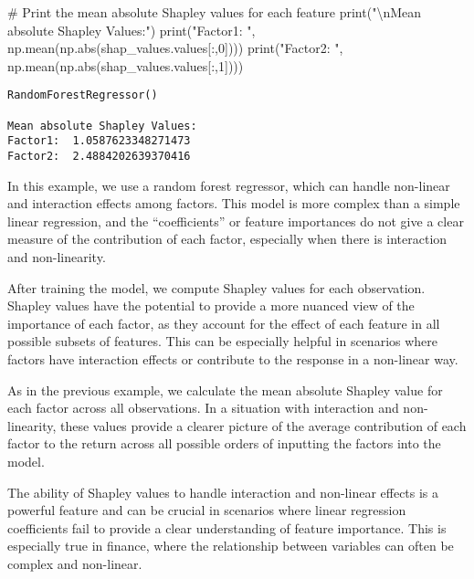 \documentclass[
  letterpaper,
  DIV=11,
  numbers=noendperiod]{scrartcl}
\newenvironment{Shaded}{\begin{snugshade}}{\end{snugshade}}
\newcommand{\BuiltInTok}[1]{\textcolor[rgb]{0.00,0.23,0.31}{#1}}
\newcommand{\CharTok}[1]{\textcolor[rgb]{0.13,0.47,0.30}{#1}}
\newcommand{\CommentTok}[1]{\textcolor[rgb]{0.37,0.37,0.37}{#1}}
\newcommand{\DecValTok}[1]{\textcolor[rgb]{0.68,0.00,0.00}{#1}}
\newcommand{\InformationTok}[1]{\textcolor[rgb]{0.37,0.37,0.37}{#1}}
\newcommand{\NormalTok}[1]{\textcolor[rgb]{0.00,0.23,0.31}{#1}}
\newcommand{\StringTok}[1]{\textcolor[rgb]{0.13,0.47,0.30}{#1}}
\begin{document}
\begin{Shaded}
\begin{Highlighting}[]
\CommentTok{\# Print the mean absolute Shapley values for each feature}
\BuiltInTok{print}\NormalTok{(}\StringTok{"}\CharTok{\textbackslash{}n}\StringTok{Mean absolute Shapley Values:"}\NormalTok{)}
\BuiltInTok{print}\NormalTok{(}\StringTok{"Factor1: "}\NormalTok{, np.mean(np.}\BuiltInTok{abs}\NormalTok{(shap\_values.values[:,}\DecValTok{0}\NormalTok{])))}
\BuiltInTok{print}\NormalTok{(}\StringTok{"Factor2: "}\NormalTok{, np.mean(np.}\BuiltInTok{abs}\NormalTok{(shap\_values.values[:,}\DecValTok{1}\NormalTok{])))}
\InformationTok{\textasciigrave{}\textasciigrave{}\textasciigrave{}}
\end{Highlighting}
\end{Shaded}

\begin{verbatim}
RandomForestRegressor()

Mean absolute Shapley Values:
Factor1:  1.0587623348271473
Factor2:  2.4884202639370416
\end{verbatim}

In this example, we use a random forest regressor, which can handle
non-linear and interaction effects among factors. This model is more
complex than a simple linear regression, and the ``coefficients'' or
feature importances do not give a clear measure of the contribution of
each factor, especially when there is interaction and non-linearity.

After training the model, we compute Shapley values for each
observation. Shapley values have the potential to provide a more nuanced
view of the importance of each factor, as they account for the effect of
each feature in all possible subsets of features. This can be especially
helpful in scenarios where factors have interaction effects or
contribute to the response in a non-linear way.

As in the previous example, we calculate the mean absolute Shapley value
for each factor across all observations. In a situation with interaction
and non-linearity, these values provide a clearer picture of the average
contribution of each factor to the return across all possible orders of
inputting the factors into the model.

The ability of Shapley values to handle interaction and non-linear
effects is a powerful feature and can be crucial in scenarios where
linear regression coefficients fail to provide a clear understanding of
feature importance. This is especially true in finance, where the
relationship between variables can often be complex and non-linear.
\end{document}
